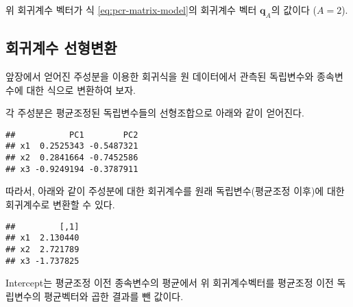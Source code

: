 \documentclass[
]{book}
\newenvironment{Shaded}{\begin{snugshade}}{\end{snugshade}}
\newcommand{\FunctionTok}[1]{\textcolor[rgb]{0.00,0.00,0.00}{#1}}
\newcommand{\NormalTok}[1]{#1}
\newcommand{\OtherTok}[1]{\textcolor[rgb]{0.56,0.35,0.01}{#1}}
\newcommand{\SpecialCharTok}[1]{\textcolor[rgb]{0.00,0.00,0.00}{#1}}
\newcommand{\StringTok}[1]{\textcolor[rgb]{0.31,0.60,0.02}{#1}}
\begin{document}
위 회귀계수 벡터가 식 \eqref{eq:pcr-matrix-model}의 회귀계수 벡터 \(\mathbf{q}_A\)의 값이다 (\(A = 2\)).

\hypertarget{pcr-regression-transform}{%
\subsection{회귀계수 선형변환}\label{pcr-regression-transform}}

앞장에서 얻어진 주성분을 이용한 회귀식을 원 데이터에서 관측된 독립변수와 종속변수에 대한 식으로 변환하여 보자.

각 주성분은 평균조정된 독립변수들의 선형조합으로 아래와 같이 얻어진다.

\begin{Shaded}
\end{Shaded}

\begin{verbatim}
##           PC1        PC2
## x1  0.2525343 -0.5487321
## x2  0.2841664 -0.7452586
## x3 -0.9249194 -0.3787911
\end{verbatim}

따라서, 아래와 같이 주성분에 대한 회귀계수를 원래 독립변수(평균조정 이후)에 대한 회귀계수로 변환할 수 있다.

\begin{Shaded}
\end{Shaded}

\begin{verbatim}
##         [,1]
## x1  2.130440
## x2  2.721789
## x3 -1.737825
\end{verbatim}

Intercept는 평균조정 이전 종속변수의 평균에서 위 회귀계수벡터를 평균조정 이전 독립변수의 평균벡터와 곱한 결과를 뺀 값이다.

\begin{Shaded}
\end{Shaded}
\end{document}
